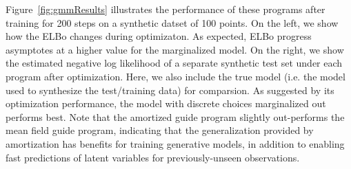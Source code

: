 Figure~\ref{fig:gmmResults} illustrates the performance of these programs after training for 200 steps on a synthetic datset of 100 points. On the left, we show how the ELBo changes during optimizaton.
As expected, ELBo progress asymptotes at a higher value for the marginalized model.
On the right, we show the estimated negative log likelihood of a separate synthetic test set under each program after optimization. Here, we also include the true model (i.e. the model used to synthesize the test/training data) for comparsion.
As suggested by its optimization performance, the model with discrete choices marginalized out performs best.
Note that the amortized guide program slightly out-performs the mean field guide program, indicating that the generalization provided by amortization has benefits for training generative models, in addition to enabling fast predictions of latent variables for previously-unseen observations.

